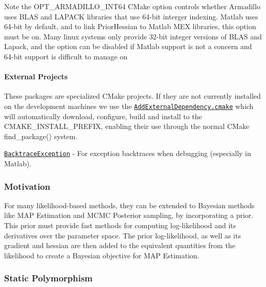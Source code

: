 Note the {\ttfamily O\+P\+T\+\_\+\+A\+R\+M\+A\+D\+I\+L\+L\+O\+\_\+\+I\+N\+T64} C\+Make option controls whether Armadillo uses B\+L\+AS and L\+A\+P\+A\+CK libraries that use 64-\/bit interger indexing. Matlab uses 64-\/bit by default, and to link Prior\+Hessian to Matlab M\+EX libraries, this option must be on. Many linux systems only provide 32-\/bit integer versions of B\+L\+AS and Lapack, and the option can be disabled if Matlab support is not a concern and 64-\/bit support is difficult to manage on

\paragraph*{External Projects}

These packages are specialized C\+Make projects. If they are not currently installed on the development machines we use the \href{https://github.com/markjolah/UncommonCMakeModules/blob/master/AddExternalDependency.cmake}{\tt Add\+External\+Dependency.\+cmake} which will automatically download, configure, build and install to the {\ttfamily C\+M\+A\+K\+E\+\_\+\+I\+N\+S\+T\+A\+L\+L\+\_\+\+P\+R\+E\+F\+IX}, enabling their use through the normal C\+Make {\ttfamily find\+\_\+package()} system.


\begin{DoxyItemize}
\item \href{https://github.com/markjolah/BacktraceException}{\tt Backtrace\+Exception} -\/ For exception backtraces when debugging (especially in Matlab).
\end{DoxyItemize}

\subsubsection*{Motivation}

For many likelihood-\/based methods, they can be extended to Bayesian methods like M\+AP Estimation and M\+C\+MC Posterior sampling, by incorporating a prior. This prior must provide fast methods for computing log-\/likelihood and it\textquotesingle{}s derivatives over the parameter space. The prior log-\/likelihood, as well as it\textquotesingle{}s gradient and hessian are then added to the equivalent quantities from the likelihood to create a Bayesian objective for M\+AP Estimation.

\subsubsection*{Static Polymorphism}

